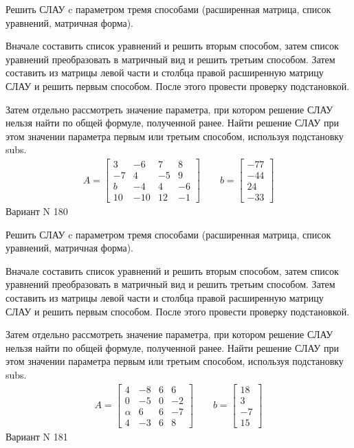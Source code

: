 \documentclass[11pt]{report}
\begin{document}
Решить СЛАУ c параметром тремя способами (расширенная матрица, список уравнений, матричная форма).

Вначале составить список уравнений и решить вторым способом,
затем список уравнений преобразовать в матричный вид и решить третьим способом.
Затем составить из матрицы левой части и столбца правой расширенную матрицу СЛАУ и решить первым способом.
После этого провести проверку подстановкой.

Затем отдельно рассмотреть значение параметра, при котором решение СЛАУ нельзя найти по общей формуле,
полученной ранее.
Найти решение СЛАУ при этом значении параметра первым или третьим способом, используя подстановку subs.
\begin{align*}
    A = \left[\begin{matrix}3 & -6 & 7 & 8\\-7 & 4 & -5 & 9\\b & -4 & 4 & -6\\10 & -10 & 12 & -1\end{matrix}\right]
\qquad b = \left[\begin{matrix}-77\\-44\\24\\-33\end{matrix}\right]
\end{align*}
\newpage
Вариант N 180


Решить СЛАУ c параметром тремя способами (расширенная матрица, список уравнений, матричная форма).

Вначале составить список уравнений и решить вторым способом,
затем список уравнений преобразовать в матричный вид и решить третьим способом.
Затем составить из матрицы левой части и столбца правой расширенную матрицу СЛАУ и решить первым способом.
После этого провести проверку подстановкой.

Затем отдельно рассмотреть значение параметра, при котором решение СЛАУ нельзя найти по общей формуле,
полученной ранее.
Найти решение СЛАУ при этом значении параметра первым или третьим способом, используя подстановку subs.
\begin{align*}
    A = \left[\begin{matrix}4 & -8 & 6 & 6\\0 & -5 & 0 & -2\\\alpha & 6 & 6 & -7\\4 & -3 & 6 & 8\end{matrix}\right]
\qquad b = \left[\begin{matrix}18\\3\\-7\\15\end{matrix}\right]
\end{align*}
\newpage
Вариант N 181
\end{document}
